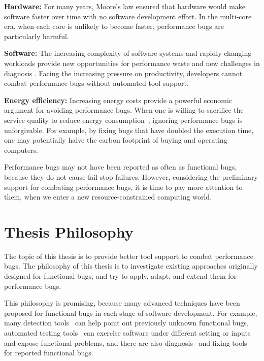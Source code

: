 {\bf Hardware:} For many years,  
  Moore's law ensured that hardware would make software faster over time 
  with no software
  development effort. In the multi-core era, when each core is unlikely to 
  become faster, performance bugs are particularly harmful.

{\bf Software:} The increasing complexity of software systems and rapidly 
changing workloads provide new opportunities for performance waste and
new challenges in diagnosis
\citep{BloatFSE2008}.
Facing the increasing pressure on productivity, 
developers cannot combat performance bugs without automated tool support. 

{\bf Energy efficiency:} 
Increasing energy costs provide a powerful economic 
argument for avoiding performance bugs. 
When one is willing to sacrifice the service quality to reduce 
energy consumption~\citep{green.pldi10,asplos11karthik}, 
ignoring performance bugs is unforgivable.
For example, by fixing bugs that have doubled the
execution time,
one may potentially
halve the carbon footprint of buying and operating computers.

Performance bugs may not have been reported as often as functional bugs, because 
they do not cause fail-stop failures.
However, considering the preliminary support for
combating performance bugs,
it is time to pay more attention to them, 
when we enter a new resource-constrained computing world.

\section{Thesis Philosophy}

The topic of this thesis is to provide better tool support to combat performance bugs. 
The philosophy of this thesis is to investigate existing approaches originally designed for 
functional bugs,
and try to apply, adapt, and extend them for performance bugs. 

This philosophy is promising, 
because many advanced techniques have been proposed for functional bugs in each stage of software development. 
For example, many detection tools~\citep{chouasplos00,billpugh,PRMiner05,semanticpatch,fortify} 
can help point out previously unknown functional bugs, 
automated testing tools~\citep{KLEE,s2e} can exercise software under different setting 
or inputs and expose functional problems, 
and there are also diagnosis~\citep{liblit03, liblit05, CCI} and 
fixing tools~\citep{afix, ofix, mfix} for reported functional bugs.

